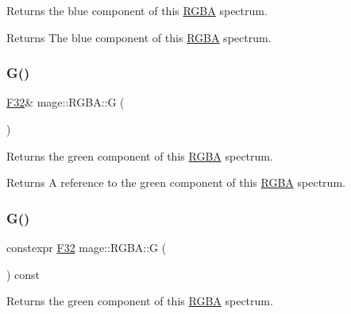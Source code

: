 Returns the blue component of this \mbox{\hyperlink{structmage_1_1_r_g_b_a}{R\+G\+BA}} spectrum.

\begin{DoxyReturn}{Returns}
The blue component of this \mbox{\hyperlink{structmage_1_1_r_g_b_a}{R\+G\+BA}} spectrum. 
\end{DoxyReturn}
\mbox{\label{structmage_1_1_r_g_b_a_af37833fee0dcd19ca286aaef7ce5cf19}} 
\subsubsection{\texorpdfstring{G()}{G()}\hspace{0.1cm}{\footnotesize\ttfamily [1/2]}}
{\footnotesize\ttfamily \mbox{\hyperlink{namespacemage_aa97e833b45f06d60a0a9c4fc22ae02c0}{F32}}\& mage\+::\+R\+G\+B\+A\+::G (\begin{DoxyParamCaption}{ }\end{DoxyParamCaption})\hspace{0.3cm}{\ttfamily [noexcept]}}

Returns the green component of this \mbox{\hyperlink{structmage_1_1_r_g_b_a}{R\+G\+BA}} spectrum.

\begin{DoxyReturn}{Returns}
A reference to the green component of this \mbox{\hyperlink{structmage_1_1_r_g_b_a}{R\+G\+BA}} spectrum. 
\end{DoxyReturn}
\mbox{\label{structmage_1_1_r_g_b_a_aa19bb0f6a025400d7eddce0b26ad4401}} 
\subsubsection{\texorpdfstring{G()}{G()}\hspace{0.1cm}{\footnotesize\ttfamily [2/2]}}
{\footnotesize\ttfamily constexpr \mbox{\hyperlink{namespacemage_aa97e833b45f06d60a0a9c4fc22ae02c0}{F32}} mage\+::\+R\+G\+B\+A\+::G (\begin{DoxyParamCaption}{ }\end{DoxyParamCaption}) const\hspace{0.3cm}{\ttfamily [noexcept]}}

Returns the green component of this \mbox{\hyperlink{structmage_1_1_r_g_b_a}{R\+G\+BA}} spectrum.

